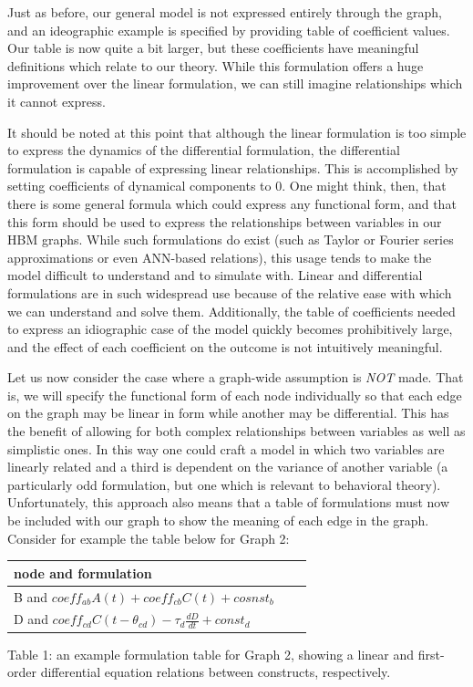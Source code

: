 \documentclass[runningheads,a4paper]{llncs}
\begin{document}
Just as before, our general model is not expressed entirely through the graph, and an  ideographic example is specified by providing table of coefficient values.
Our table is now quite a bit larger, but these coefficients have meaningful definitions which relate to our theory.
While this formulation offers a huge improvement over the linear formulation, we can still imagine relationships which it cannot express.

It should be noted at this point that although the linear formulation is too simple to express the dynamics of the differential formulation, the differential formulation is capable of expressing linear relationships.
This is accomplished by setting coefficients of dynamical components to 0.
One might think, then, that there is some general formula which could express any functional form, and that this form should be used to express the relationships between variables in our HBM graphs.
While such formulations do exist (such as Taylor or Fourier series approximations or even ANN-based relations), this usage tends to make the model difficult to understand and to simulate with.
Linear and differential formulations are in such widespread use because of the relative ease with which we can understand and solve them. 
Additionally, the table of coefficients needed to express an idiographic case of the model quickly becomes prohibitively large, and the effect of each coefficient on the outcome is not intuitively meaningful.

Let us now consider the case where a graph-wide assumption is \emph{NOT} made.
That is, we will specify the functional form of each node individually so that each edge on the graph may be linear in form while another may be differential.
This has the benefit of allowing for both complex relationships between variables as well as simplistic ones.
In this way one could craft a model in which two variables are linearly related and a third is dependent on the variance of another variable (a particularly odd formulation, but one which is relevant to behavioral theory).
Unfortunately, this approach also means that a table of formulations must now be included with our graph to show the meaning of each edge in the graph.
Consider for example the table below for Graph 2:

\begin{centering}
  \begin{tabular}{ | l | l | l |}
      \hline
      node and formulation \\ \hline
      B and $coeff_{ab}A(t) + coeff_{cb}C(t) + cosnst_b$  \\ \hline
      D and $coeff_{cd}C(t-\theta_{cd}) - \tau_{d}\frac{dD}{dt} + const_d$ \\ \hline
  \end{tabular}
  
  Table 1: an example formulation table for Graph 2, showing a linear and first-order differential equation relations between constructs, respectively.
\end{centering}
\end{document}
